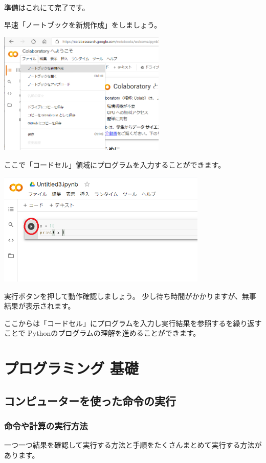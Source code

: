 \documentclass[11pt,a4paper,dvipdfmx,titlepage]{jsreport}
\begin{document}
準備はこれにて完了です。

早速「ノートブックを新規作成」をしましょう。

\includegraphics[width=8cm]{images/colab03.png}

ここで「コードセル」領域にプログラムを入力することができます。

\includegraphics[width=10cm]{images/colab04.png}

実行ボタンを押して動作確認しましょう。
少し待ち時間がかかりますが、無事結果が表示されます。

ここからは「コードセル」にプログラムを入力し実行結果を参照するを繰り返すことで
Pythonのプログラムの理解を進めることができます。

\chapter{プログラミング 基礎}
\setcounter{section}{0}

\section{コンピューターを使った命令の実行}
\subsection{命令や計算の実行方法}
 一つ一つ結果を確認して実行する方法と手順をたくさんまとめて実行する方法があります。
\end{document}
